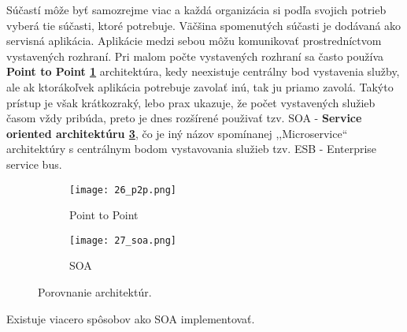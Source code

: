 Súčastí môže byť samozrejme viac a každá organizácia si podľa svojich potrieb vyberá tie  súčasti, ktoré potrebuje. Väčšina spomenutých súčasti je dodávaná ako servisná aplikácia. Aplikácie medzi sebou môžu komunikovať prostredníctvom vystavených rozhraní. Pri malom počte vystavených rozhraní sa často používa \textbf{Point to Point \ref{26_p2p}} architektúra, kedy neexistuje centrálny bod vystavenia služby, ale ak ktorákoľvek aplikácia potrebuje zavolať inú, tak ju priamo zavolá. Takýto prístup je však krátkozraký, lebo prax ukazuje, že počet vystavených služieb časom vždy pribúda, preto je dnes rozšírené použivať tzv. SOA - \textbf{Service oriented architektúru \ref{27_soa}}, čo je iný názov spomínanej ,,Microservice`` architektúry s centrálnym bodom vystavovania služieb tzv. ESB - Enterprise service bus.
\begin{figure}[!htbp]
\centering
\begin{subfigure}{0.5\linewidth}
\texttt{[image: 26\_p2p.png]}
\caption{Point to Point \cite{IOT13}}
\label{26_p2p}
\end{subfigure}%
\begin{subfigure}{0.5\linewidth}
\texttt{[image: 27\_soa.png]}
\caption{SOA \cite{IOT13}}
\label{27_soa}
\end{subfigure}
\caption{Porovnanie architektúr.}
\end{figure}
Existuje viacero spôsobov ako SOA implementovať. 
